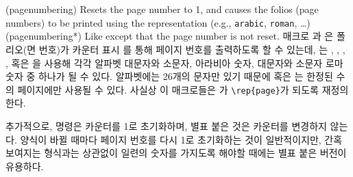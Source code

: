 \begin{syntax}
\cmd{\pagenumbering} \\
\cmd{\pagenumbering*} \\
\end{syntax}
\glossary(pagenumbering)%
  {}%
  {Resets the page number to 1, and causes the folios (page numbers) to be 
   printed using the 
   representation (e.g., \texttt{arabic}, \texttt{roman}, \ldots)}
\glossary(pagenumbering*)%
  {}%
  {Like  except that the page number is not reset.}
매크로 \cmd{\pagenumbering}과 \cmd{\pagenumbering*}은
폴리오(면 번호)가 카운터
표시 를 통해 페이지 번호를
출력하도록 할 수 있는데, 는 , ,
, , 혹은 을 사용해 각각 알파벳
대문자와 소문자, 아라비아 숫자, 대문자와 소문자 로마 숫자 중 하나가 될 수
있다.
알파벳에는 26개의 문자만 있기 때문에  혹은 는
한정된 수의 페이지에만 사용될 수 있다.
사실상 이 매크로들은 \cmd{\thepage}가 \verb|\rep{page}|가 되도록 재정의한다.

추가적으로, \cmd{\pagenumbering}
명령은  카운터를 1로 초기화하며, 별표 붙은 것은 카운터를 변경하지
않는다.
양식이 바뀔 때마다 페이지 번호를 다시 1로 초기화하는 것이 일반적이지만, 간혹
보여지는 형식과는 상관없이 일련의 숫자를 가지도록 해야할 때에는 별표 붙은 버전이
유용하다.

